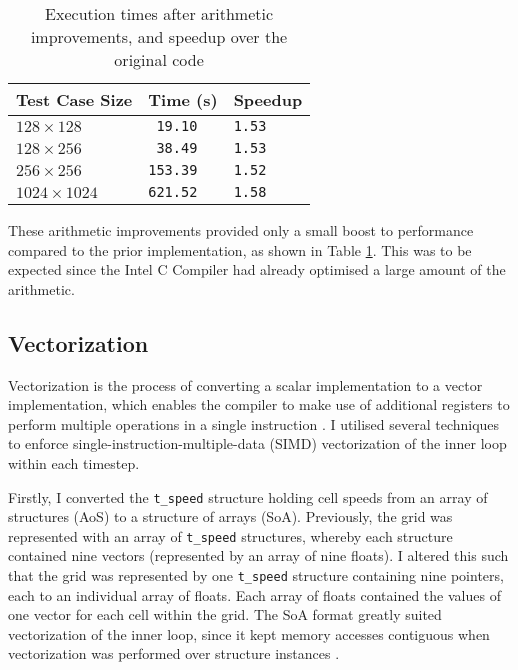 \documentclass[11pt, twocolumn, a4paper]{article}
\begin{document}
\begin{table}[htbp]
  \begin{center}
  \caption{Execution times after arithmetic improvements, and speedup over the original code}\label{tab:arithmetic_improvements}
  \begin{tabular}{l | l l} 
      \hline\hline
      Test Case Size&Time (s)&Speedup\\
      \hline
      $128 \times 128$&\texttt{ 19.10}&\texttt{1.53}\\
      $128 \times 256$&\texttt{ 38.49}&\texttt{1.53}\\
      $256 \times 256$&\texttt{153.39}&\texttt{1.52}\\
      $1024 \times 1024$&\texttt{621.52}&\texttt{1.58}\\
      \hline
    \end{tabular}
  \end{center}
\end{table}

These arithmetic improvements provided only a small boost to performance compared to the prior implementation, as shown in Table \ref{tab:arithmetic_improvements}.
This was to be expected since the Intel C Compiler had already optimised a large amount of the arithmetic.

\subsection{Vectorization}

Vectorization is the process of converting a scalar implementation to a vector implementation, which enables the compiler to make use of additional registers to perform multiple operations in a single instruction \cite{vectorization}.
I utilised several techniques to enforce single-instruction-multiple-data (SIMD) vectorization of the inner loop within each timestep.

Firstly, I converted the \texttt{t\_speed} structure holding cell speeds from an array of structures (AoS) to a structure of arrays (SoA).
Previously, the grid was represented with an array of \texttt{t\_speed} structures, whereby each structure contained nine vectors (represented by an array of nine floats).
I altered this such that the grid was represented by one \texttt{t\_speed} structure containing nine pointers, each to an individual array of floats.
Each array of floats contained the values of one vector for each cell within the grid.
The SoA format greatly suited vectorization of the inner loop, since it kept memory accesses contiguous when vectorization was performed over structure instances \cite{soa}.
\end{document}
